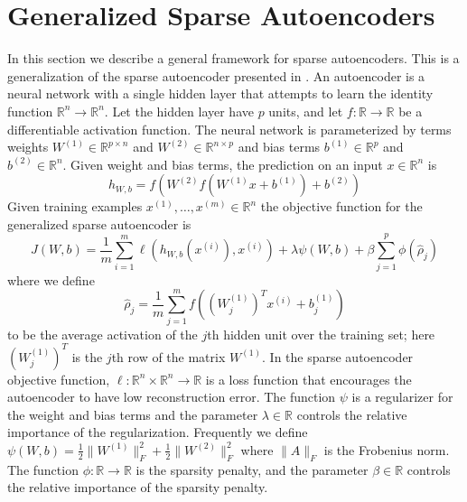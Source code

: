 \documentclass[twocolumn]{article}
\newcommand{\RR}{\mathbb{R}}
\newcommand{\ra}{\rightarrow}
\newcommand{\Wo}{W^{(1)}}
\newcommand{\Wt}{W^{(2)}}
\newcommand{\bo}{b^{(1)}}
\newcommand{\bt}{b^{(2)}}
\newcommand{\xii}{x^{(i)}}
\begin{document}

\appendix
\section{Generalized Sparse Autoencoders}
\label{gen_sparse_auto}
In this section we describe a general framework for sparse autoencoders.
This is a generalization of the sparse autoencoder presented in \cite{ufldl-tutorial}.
An autoencoder is a neural network with a single hidden layer that attempts to learn the identity function
$\RR^n\ra\RR^n$. Let the hidden layer have $p$ units, and let $f:\RR\ra\RR$ be a differentiable activation
function. The neural network is parameterized by terms weights $\Wo\in\RR^{p\times n}$ and
$\Wt\in\RR^{n\times p}$ and bias terms $\bo\in\RR^p$ and $\bt\in\RR^n$. Given weight and bias terms, the
prediction on an input $x\in\RR^n$ is
\[h_{W,b}=f(\Wt f(\Wo x+\bo)+\bt)\]
Given training examples $x^{(1)},\ldots,x^{(m)}\in\RR^n$ the objective function for the generalized sparse
autoencoder is
\[J(W,b)=\frac1m\sum_{i=1}^m\ell(h_{W,b}(\xii),\xii)+\lambda\psi(W,b)+\beta\sum_{j=1}^p\phi(\hat\rho_j)\]
where we define
\[\hat\rho_j=\frac1m\sum_{j=1}^mf\left((\Wo_j)^T\xii+\bo_j\right)\]
to be the average activation of the $j$th hidden unit over the training set; here $(\Wo_j)^T$ is the
$j$th row of the matrix $\Wo$. In the sparse autoencoder objective function, $\ell:\RR^n\times\RR^n\ra\RR$
is a loss function that encourages the autoencoder to have low reconstruction error.
The function $\psi$ is a regularizer for the weight
and bias terms and the parameter $\lambda\in\RR$ controls the relative importance of the regularization.
Frequently we define $\psi(W,b)=\frac12\|\Wo\|^2_F+\frac12\|\Wt\|^2_F$ where $\|A\|_F$ is the Frobenius norm.
The function $\phi:\RR\ra\RR$ is the sparsity penalty, and the parameter $\beta\in\RR$ controls the relative
importance of the sparsity penalty.
\end{document}

